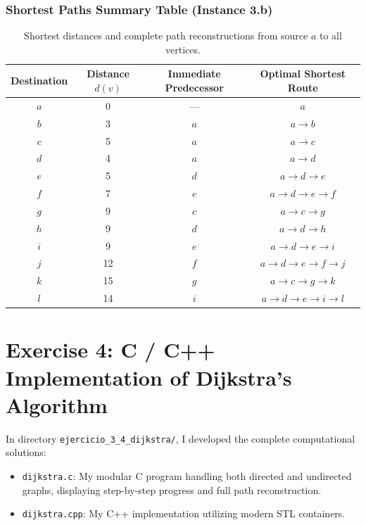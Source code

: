 \documentclass[11pt,a4paper]{article}
\begin{document}
\subsubsection{Shortest Paths Summary Table (Instance 3.b)}

\begin{table}[H]
\centering
\caption{Shortest distances and complete path reconstructions from source $a$ to all vertices.}
\label{tab:dijkstra_3b_summary}
\begin{tabular}{cccc}
\toprule
\textbf{Destination} & \textbf{Distance $d(v)$} & \textbf{Immediate Predecessor} & \textbf{Optimal Shortest Route} \\
\midrule
$a$ & 0 & --- & $a$ \\
$b$ & 3 & $a$ & $a \rightarrow b$ \\
$c$ & 5 & $a$ & $a \rightarrow c$ \\
$d$ & 4 & $a$ & $a \rightarrow d$ \\
$e$ & 5 & $d$ & $a \rightarrow d \rightarrow e$ \\
$f$ & 7 & $e$ & $a \rightarrow d \rightarrow e \rightarrow f$ \\
$g$ & 9 & $c$ & $a \rightarrow c \rightarrow g$ \\
$h$ & 9 & $d$ & $a \rightarrow d \rightarrow h$ \\
$i$ & 9 & $e$ & $a \rightarrow d \rightarrow e \rightarrow i$ \\
$j$ & 12 & $f$ & $a \rightarrow d \rightarrow e \rightarrow f \rightarrow j$ \\
$k$ & 15 & $g$ & $a \rightarrow c \rightarrow g \rightarrow k$ \\
$l$ & 14 & $i$ & $a \rightarrow d \rightarrow e \rightarrow i \rightarrow l$ \\
\bottomrule
\end{tabular}
\end{table}

\newpage

\section{Exercise 4: C / C++ Implementation of Dijkstra's Algorithm}

In directory \texttt{ejercicio\_3\_4\_dijkstra/}, I developed the complete computational solutions:
\begin{itemize}
    \item \texttt{dijkstra.c}: My modular C program handling both directed and undirected graphs, displaying step-by-step progress and full path reconstruction.
    \item \texttt{dijkstra.cpp}: My C++ implementation utilizing modern STL containers.
\end{itemize}
\end{document}
